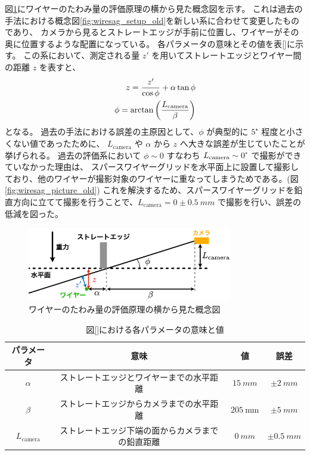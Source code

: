 \documentclass[../../main.tex]{subfiles}
\begin{document}
図\ref{fig:wiresag_concept_yoko}にワイヤーのたわみ量の評価原理の横から見た概念図を示す。
これは過去の手法における概念図\ref{fig:wiresag_setup_old}を新しい系に合わせて変更したものであり、
カメラから見るとストレートエッジが手前に位置し、ワイヤーがその奥に位置するような配置になっている。
各パラメータの意味とその値を表\ref{}に示す。
この系において、測定される量 $z'$ を用いてストレートエッジとワイヤー間の距離 $z$ を表すと、
\begin{align}
    z = \dfrac{z'}{\cos\phi} + \alpha\tan\phi \\
    \phi = \arctan\qty(\dfrac{L_{\mathrm{camera}}}{\beta})
\end{align}
となる。
過去の手法における誤差の主原因として、$\phi$ が典型的に $5\tcdegree$ 程度と小さくない値であったために、
$L_{\mathrm{camera}}$ や $\alpha$ から $z$ へ大きな誤差が生じていたことが挙げられる\cite{swg:murata}。
過去の評価系において $\phi\sim0$ すなわち $L_{\mathrm{camera}} \sim 0\tcdegree$ で撮影ができていなかった理由は、
スパースワイヤーグリッドを水平面上に設置して撮影しており、他のワイヤーが撮影対象のワイヤーに重なってしまうためである。(図\ref{fig:wiresag_picture_old})
これを解決するため、スパースワイヤーグリッドを鉛直方向に立てて撮影を行うことで、$L_{\mathrm{camera}}=0\pm\SI{0.5}{mm}$ で撮影を行い、誤差の低減を図った。
\begin{figure}[H]
    \centering
    \includegraphics[width=0.8\textwidth]{wiresag/wiresag_concept_yoko.pdf}
    \caption{ワイヤーのたわみ量の評価原理の横から見た概念図}
    \label{fig:wiresag_concept_yoko}
\end{figure}
\begin{table}[H]
    \centering
    \caption{図\ref{}における各パラメータの意味と値}
    \begin{tabular}{cccc}
        パラメータ & 意味 & 値 & 誤差 \\
        \hline\hline
        $\alpha$ & ストレートエッジとワイヤーまでの水平距離 & $\SI{15}{mm}$ & $\pm\SI{2}{mm}$ \\
        $\beta$ & ストレートエッジからカメラまでの水平距離 & $\SI{205}{\mm}$ & $\pm\SI{5}{mm}$ \\
        $L_{\mathrm{camera}}$ & ストレートエッジ下端の面からカメラまでの鉛直距離 & $\SI{0}{mm}$ & $\pm\SI{0.5}{mm}$ \\
    \end{tabular}
\end{table}
\end{document}
